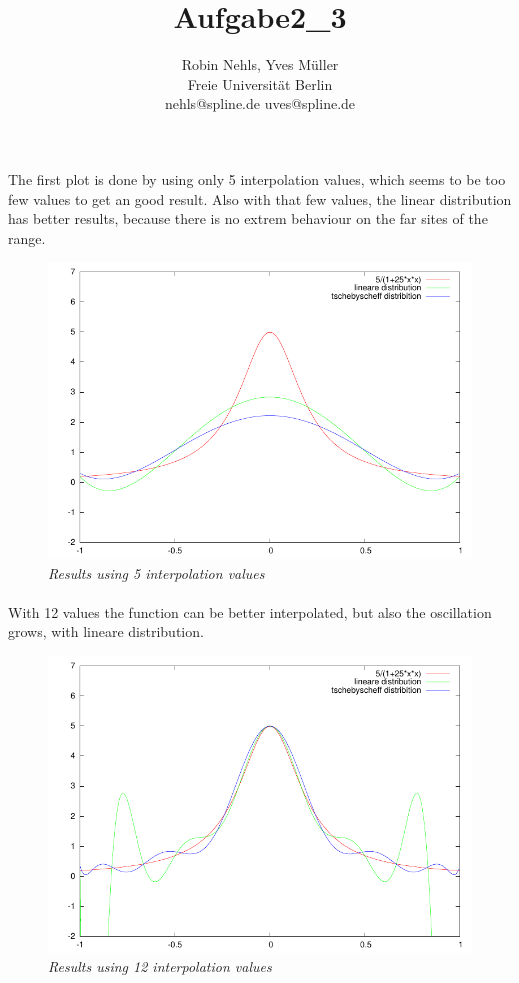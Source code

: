 \documentclass[11pt,a4paper,notitlepage,onecolumn]{article}
\title{Aufgabe2\_3}
\author{Robin Nehls, Yves Müller\\
  Freie Universit\"at Berlin\\
  nehls@spline.de uves@spline.de }
\date{}
\begin{document}
\maketitle

\paragraph{}
The first plot is done by using only 5 interpolation values, which seems 
to be too few values to get an good result. Also with that few values, the
linear distribution has better results, because there is no extrem 
behaviour on the far sites of the range. 

\begin{figure}
\centering
\includegraphics[width=\textwidth]{aufgabe3-2based5.pdf}
\caption{\em \small Results using 5 interpolation values}
\end{figure}


\paragraph{}
With 12 values the function can be better interpolated, but also the 
oscillation grows, with lineare distribution.

\begin{figure}
\centering
\includegraphics[width=\textwidth]{aufgabe3-2based12.pdf}
\caption{\em \small Results using 12 interpolation values}
\end{figure}
\end{document}
